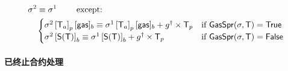 \begin{align}
	& \mathbf{\sigma}^2  \equiv \mathbf{\sigma}^1 \qquad \mbox{  except:}\\
	& \quad \begin{cases} 
		\mathbf{\sigma}^2\left[\textsf{T}_a\right]_p[{\sf gas}]_b \equiv \mathbf{\sigma}^1\left[\textsf{T}_a\right]_p[{\sf gas}]_b+g^{\dagger}\times \textsf{T}_p 
		& \mbox{if $\mathsf{GasSpr}(\mathbf{\sigma},\textsf{T})=\mathsf{True}$}\\
		\mathbf{\sigma}^2 \left[\mathsf{S}{\left({\textsf{T}} \right)}\right]_b \equiv \mathbf{\sigma}^1\left[\mathsf{S}{\left({\textsf{T}} \right)}\right]_b + g^{\dagger}\times \textsf{T}_p 
		& \mbox{if $\mathsf{GasSpr}(\mathbf{\sigma},\textsf{T})=\mathsf{False}$}
	\end{cases} 
\end{align}

\paragraph{已终止合约处理} 

